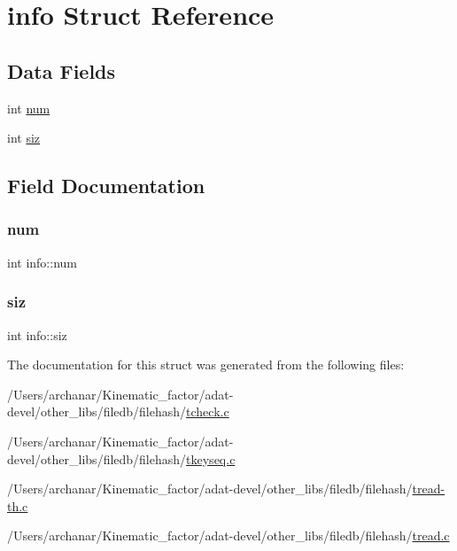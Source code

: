 \hypertarget{structinfo}{}\section{info Struct Reference}
\label{structinfo}
\subsection*{Data Fields}
\begin{DoxyCompactItemize}
\item 
int \mbox{\hyperlink{structinfo_abb5c86ef42017dac754a087c6bc0bd56}{num}}
\item 
int \mbox{\hyperlink{structinfo_ab47b7116d4e2bfcfdfa6dfb0254439db}{siz}}
\end{DoxyCompactItemize}


\subsection{Field Documentation}
\mbox{\label{structinfo_abb5c86ef42017dac754a087c6bc0bd56}} 
\subsubsection{\texorpdfstring{num}{num}}
{\footnotesize\ttfamily int info\+::num}

\mbox{\label{structinfo_ab47b7116d4e2bfcfdfa6dfb0254439db}} 
\subsubsection{\texorpdfstring{siz}{siz}}
{\footnotesize\ttfamily int info\+::siz}



The documentation for this struct was generated from the following files\+:\begin{DoxyCompactItemize}
\item 
/\+Users/archanar/\+Kinematic\+\_\+factor/adat-\/devel/other\+\_\+libs/filedb/filehash/\mbox{\hyperlink{adat-devel_2other__libs_2filedb_2filehash_2tcheck_8c}{tcheck.\+c}}\item 
/\+Users/archanar/\+Kinematic\+\_\+factor/adat-\/devel/other\+\_\+libs/filedb/filehash/\mbox{\hyperlink{adat-devel_2other__libs_2filedb_2filehash_2tkeyseq_8c}{tkeyseq.\+c}}\item 
/\+Users/archanar/\+Kinematic\+\_\+factor/adat-\/devel/other\+\_\+libs/filedb/filehash/\mbox{\hyperlink{adat-devel_2other__libs_2filedb_2filehash_2tread-th_8c}{tread-\/th.\+c}}\item 
/\+Users/archanar/\+Kinematic\+\_\+factor/adat-\/devel/other\+\_\+libs/filedb/filehash/\mbox{\hyperlink{adat-devel_2other__libs_2filedb_2filehash_2tread_8c}{tread.\+c}}\end{DoxyCompactItemize}
